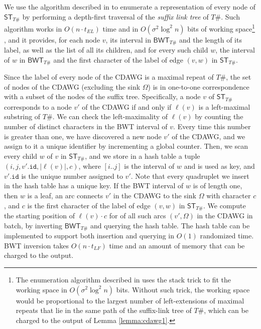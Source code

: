 \documentclass[a4paper,UKenglish]{lipics-v2016}
\newcommand{\ST}{\ensuremath{\mathsf{ST}}}
\newcommand{\BWT}{\ensuremath{\mathsf{BWT}}}
\begin{document}
We use the algorithm described in \cite{belazzougui2014linear} to enumerate a representation of every node of $\ST_{T\#}$ by performing a depth-first traversal of the \emph{suffix link tree} of $T\#$. Such algorithm works in $O(n \cdot t_{EL})$ time and in $O(\sigma^{2}\log^{2}n)$ bits of working space\footnote{The enumeration algorithm described in \cite{belazzougui2014linear} uses the stack trick to fit the working space in $O(\sigma^{2}\log^{2}n)$ bits. Without such trick, the working space would be proportional to the largest number of left-extensions of maximal repeats that lie in the same path of the suffix-link tree of $T\#$, which can be charged to the output of Lemma \ref{lemma:cdawg1}.}
, and it provides, for each node $v$, its interval in $\BWT_{T\#}$ and the length of its label, as well as the list of all its children, and for every such child $w$, the interval of $w$ in $\BWT_{T\#}$ and the first character of the label of edge $(v,w)$ in $\ST_{T\#}$. 

Since the label of every node of the CDAWG is a maximal repeat of $T\#$, the set of nodes of the CDAWG (excluding the sink $\Omega$) is in one-to-one correspondence with a subset of the nodes of the suffix tree. Specifically, a node $v$ of $\ST_{T\#}$ corresponds to a node $v'$ of the CDAWG if and only if $\ell(v)$ is a left-maximal substring of $T\#$. We can check the left-maximality of $\ell(v)$ by counting the number of distinct characters in the BWT interval of $v$. Every time this number is greater than one, we have discovered a new node $v'$ of the CDAWG, and we assign to it a unique identifier by incrementing a global counter. Then, we scan every child $w$ of $v$ in $\ST_{T\#}$, and we store in a hash table a tuple $(i,j,v'.\mathtt{id},|\ell(v)|,c)$, where $[i..j]$ is the interval of $w$ and is used as key, and $v'.\mathtt{id}$ is the unique number assigned to $v'$. Note that every quadruplet we insert in the hash table has a unique key. If the BWT interval of $w$ is of length one, then $w$ is a leaf, an arc connects $v'$ in the CDAWG to the sink $\Omega$ with character $c$, and $c$ is the first character of the label of edge $(v,w)$ in $\ST_{T\#}$. We compute the starting position of $\ell(v) \cdot c$ for of all such arcs $(v',\Omega)$ in the CDAWG in batch, by inverting $\BWT_{T\#}$ and querying the hash table. The hash table can be implemented to support both insertion and querying in $O(1)$ randomized time. BWT inversion takes $O(n \cdot t_{LF})$ time and an amount of memory that can be charged to the output.
\end{document}
